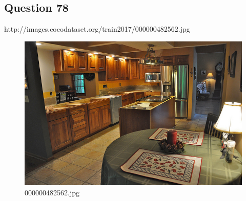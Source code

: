 \subsection*{Question 78}
http://images.cocodataset.org/train2017/000000482562.jpg
\begin{figure}[h]
    \centering
    \includegraphics[width=0.8\linewidth]{../image set/hard/000000482562.jpg}
    \caption{000000482562.jpg}
\end{figure}
